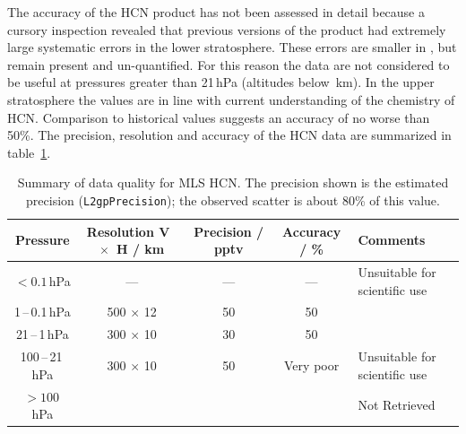 \documentclass[11pt,draft]{report}
\newlength{\tablecaptionsep}
\begin{document}
The accuracy of the HCN product has not been assessed in detail
because a cursory inspection revealed that previous versions of the
product had extremely large systematic errors in the lower
stratosphere. These errors are smaller in \thisv, but remain present and
un-quantified.  For this reason the data are not considered to be useful
at pressures greater than 21\,hPa (altitudes
below \,km).  In the upper stratosphere the values are
in line with current understanding of the chemistry of HCN\@.
Comparison to historical values suggests an accuracy of no worse than
50\%. The precision, resolution and accuracy of the HCN data are
summarized in table~\ref{tab:HCNSummary}.

\begin{table}
  \caption{Summary of data quality for MLS \thisv HCN\@. The precision shown
    is the estimated precision (\texttt{L2gpPrecision}); the observed
    scatter is about 80\% of this value.}
  \vspace{\tablecaptionsep}
\label{tab:HCNSummary}
\centering\begin{tabular}{ccccm{25ex}}
  \toprule
  \parbox{10ex}{\bfseries\centering Pressure} &
  \parbox{11ex}{\bfseries\centering Resolution \mbox{V $\times$ H} / km} &
  \parbox{10ex}{\bfseries\centering Precision / pptv} &
  \parbox{10ex}{\bfseries\centering Accuracy / \%} &
  \parbox{12ex}{\bfseries\centering Comments}\\
  \midrule
  $< 0.1$\,hPa & ---    &  ---      &  ---     & Unsuitable for scientific use\\
  1\,--\,0.1\,hPa & 500 $\times$ 12   & 50 & 50 & \\
  21\,--\,1\,hPa & 300 $\times$ 10   & 30 & 50 & \\
  100\,--\,21\,hPa  & 300 $\times$ 10 & 50 & Very poor & Unsuitable for scientific use\\
  $> 100$\,hPa &                 &   &    &  Not Retrieved\\
  \bottomrule
\end{tabular}
\end{table}
\end{document}
